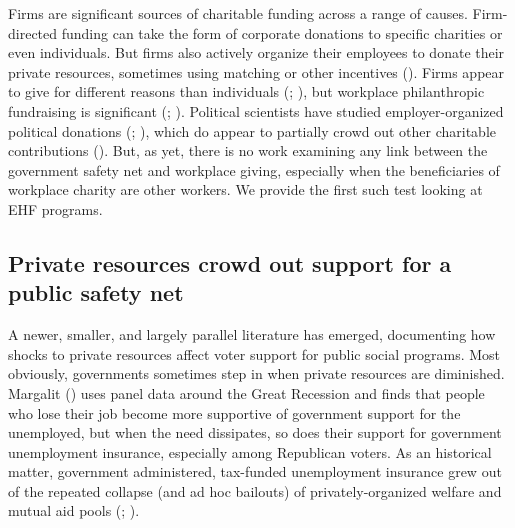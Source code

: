 \documentclass[
  11pt,
  oneside]{article}
\begin{document}
Firms are significant sources of charitable funding across a range of causes. Firm-directed funding can take the form of corporate donations to specific charities or even individuals. But firms also actively organize their employees to donate their private resources, sometimes using matching or other incentives (). Firms appear to give for different reasons than individuals (; ), but workplace philanthropic fundraising is significant (; ). Political scientists have studied employer-organized political donations (; ), which do appear to partially crowd out other charitable contributions (). But, as yet, there is no work examining any link between the government safety net and workplace giving, especially when the beneficiaries of workplace charity are other workers. We provide the first such test looking at EHF programs.

\subsection{Private resources crowd out support for a public safety net}\label{private-resources-crowd-out-support-for-a-public-safety-net}

A newer, smaller, and largely parallel literature has emerged, documenting how shocks to private resources affect voter support for public social programs. Most obviously, governments sometimes step in when private resources are diminished. Margalit () uses panel data around the Great Recession and finds that people who lose their job become more supportive of government support for the unemployed, but when the need dissipates, so does their support for government unemployment insurance, especially among Republican voters. As an historical matter, government administered, tax-funded unemployment insurance grew out of the repeated collapse (and ad hoc bailouts) of privately-organized welfare and mutual aid pools (; ).
\end{document}
